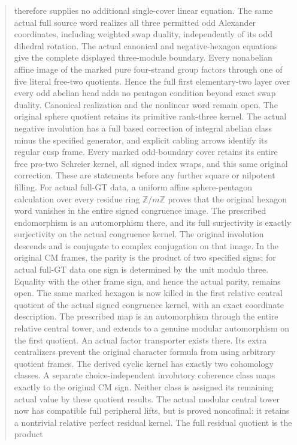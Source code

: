 \documentclass[11pt,a4paper]{article}
\begin{document}
\begin{abstract}
therefore supplies no additional single-cover linear equation. The same actual full
source word realizes all three permitted odd Alexander coordinates,
including weighted swap duality, independently of its odd dihedral
rotation. The actual canonical and negative-hexagon equations give the
complete displayed three-module boundary. Every nonabelian affine
image of the marked pure four-strand group factors through one of five
literal free-two quotients. Hence the full first elementary-two layer
over every odd abelian head adds no pentagon condition beyond exact
swap duality. Canonical realization and the nonlinear word remain open.
The original sphere quotient retains its primitive rank-three kernel.
The actual negative involution has a full based correction of integral
abelian class minus the specified generator, and explicit cabling
arrows identify its regular cusp frame. Every marked odd-boundary
cover retains its entire free pro-two Schreier kernel, all signed
index wraps, and this same original correction. These are statements
before any further square or nilpotent filling.
For actual full-GT data, a uniform affine sphere-pentagon calculation
over every residue ring $\mathbb Z/m\mathbb Z$ proves that the original
hexagon word vanishes in the entire signed
congruence image. The prescribed endomorphism is an automorphism
there, and its full surjectivity is exactly surjectivity on the actual
congruence kernel. The original involution descends and is conjugate
to complex conjugation on that image. In the original CM frames,
the parity is the product of two specified signs; for actual full-GT
data one sign is determined by the unit modulo three. Equality with
the other frame sign, and hence the actual parity, remains open.
The same marked hexagon is now killed in the first relative central
quotient of the actual signed congruence kernel, with an exact
coordinate description. The prescribed map is an automorphism
through the entire relative central tower, and extends to a genuine
modular automorphism on the first quotient. An actual factor
transporter exists there. Its extra centralizers prevent the
original character formula from using arbitrary quotient frames.
The derived cyclic kernel has exactly two cohomology classes.
A separate choice-independent involutory coherence class maps
exactly to the original CM sign. Neither class is assigned its
remaining actual value by these quotient results.
The actual modular central tower now has compatible full peripheral
lifts, but is proved noncofinal: it retains a nontrivial relative
perfect residual kernel. The full residual quotient is the product

\end{abstract}
\end{document}
